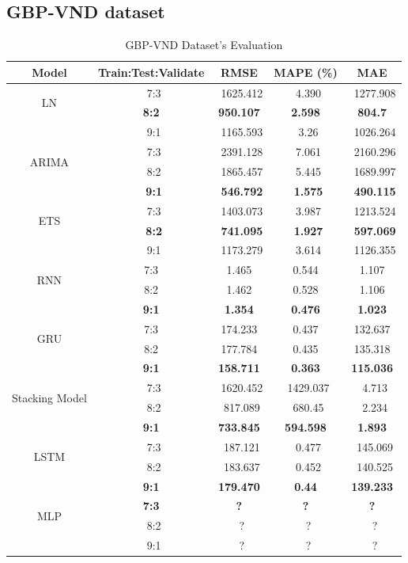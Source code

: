 \documentclass{ieeeojies}
\begin{document}
\subsection{GBP-VND dataset} 
\begin{table}[H]
    \centering
    \begin{tabular}{|c|c|c|c|c|}
         \hline
         \centering Model & Train:Test:Validate & RMSE & MAPE (\%) & MAE\\
         \hline
         \multirow{2}{*}{LN} &\ 7:3  &\ 1625.412 &\ 4.390 &\ 1277.908  \\ &\textbf{8:2} &\textbf{950.107} &\textbf{2.598} &\textbf{804.7} \\&\ 9:1 &\ 1165.593 &\ 3.26 &\ 1026.264 \\
         \hline
         \multirow{2}{*}{ARIMA} &\ 7:3 &\ 2391.128&\ 7.061 &\ 2160.296 \\ &\ 8:2 &\ 1865.457 &\ 5.445 &\ 1689.997 \\&\ \textbf{9:1} &\ \textbf{546.792} &\ \textbf{1.575} &\ \textbf{490.115} \\
         \hline
         \multirow{2}{*}{ETS} &\ 7:3&\ 1403.073&\ 3.987&\ 1213.524 \\ &\ \textbf{8:2} &\ \textbf{741.095}&\ \textbf{1.927}&\ \textbf{597.069}\\&\ 9:1 &\ 1173.279 &\ 3.614 &\ 1126.355 \\
         \hline
         \multirow{2}{*}{RNN} & 7:3 & 1.465 & 0.544 & 1.107  \\ & 8:2 & 1.462 & 0.528 & 1.106 \\&\textbf{ 9:1} & \textbf{1.354} &\textbf{ 0.476} &\textbf{ 1.023} \\
         \hline
         \multirow{2}{*}{GRU} & 7:3 & 174.233 & 0.437 & 132.637 \\ & 8:2 & 177.784 & 0.435 & 135.318 \\ &\textbf{9:1} &\textbf{158.711}&\textbf{0.363}&\textbf{115.036} \\      \hline
         \multirow{2}{*}{Stacking Model} &\ 7:3 &\ 1620.452&\ 1429.037&\ 4.713 \\ &\ 8:2 &\ 817.089&\ 680.45 &\ 2.234 \\&\textbf{9:1} &\textbf{733.845} &\textbf{594.598} &\textbf{1.893} \\
         \hline
         \multirow{2}{*}{LSTM} &\ 7:3 &\ 187.121 &\ 0.477 &\ 145.069 \\ &\ 8:2 &\ 183.637 &\ 0.452 &\ 140.525 \\&\textbf{9:1} &\textbf{179.470} &\textbf{0.44} &\textbf{139.233} \\
         \hline
         \multirow{2}{*}{MLP} &\textbf{7:3} &\textbf{?}&\textbf{?}&\textbf{?} \\ &\ 8:2 &\ ?&\ ? &\ ? \\&\ 9:1 &\ ? &\ ? &\ ? \\
         \hline
    \end{tabular}
    \caption{GBP-VND Dataset's Evaluation}
    \label{mbbresult}
\end{table}
\end{document}

